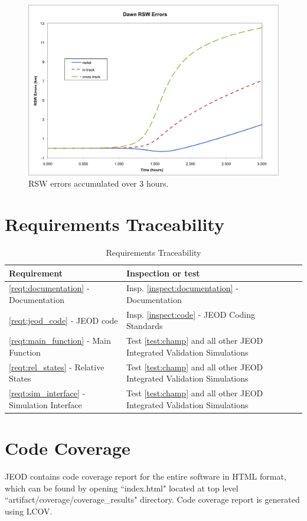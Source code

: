 \begin{description}
\begin{figure}
\begin{center}
\includegraphics [width=7.0in]{figs/dawn/dawn_enc.png}
\end{center}
\caption{RSW errors accumulated over 3 hours.}
\label{fig:11}
\end{figure}

\end{description}
\clearpage
\newpage


\section{Requirements Traceability}\label{sec:traceability}

\begin{table}[ht]
\centering
\caption{Requirements Traceability}
\begin{tabular}{||l|l|l|} \hline
{\bf Requirement} & {\bf Inspection or test} \\ \hline \hline
\ref{reqt:documentation} - Documentation &
  Insp. \ref{inspect:documentation} - Documentation \\ \hline
\ref{reqt:jeod_code} - JEOD code &
  Insp. \ref{inspect:code} - JEOD Coding Standards \\ \hline
\ref{reqt:main_function} - Main Function &
  Test \ref{test:champ} and all other JEOD Integrated Validation Simulations \\ \hline
\ref{reqt:rel_states} - Relative States &
Test \ref{test:champ} and all other JEOD Integrated Validation Simulations \\ \hline
\ref{reqt:sim_interface} - Simulation Interface &
Test \ref{test:champ} and all other JEOD Integrated Validation Simulations \\ \hline
\hline
\end{tabular}
\end{table}


\section{Code Coverage}\label{sec:code_coverage}
JEOD contains code coverage report for the entire software in HTML format,
which can be found by opening ``index.html" located at top level
``artifact/coverage/coverage\_results" directory. Code coverage report is
generated using LCOV.
